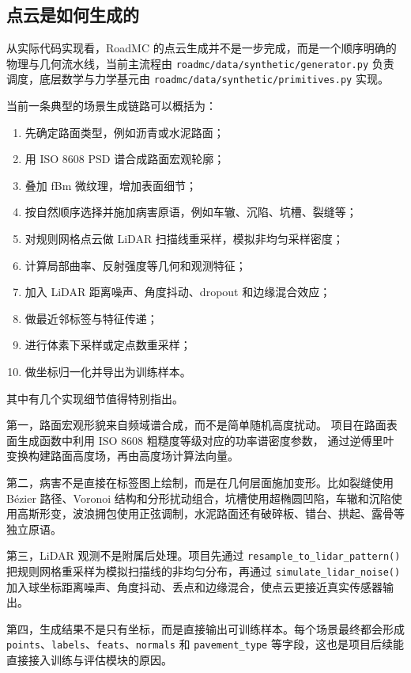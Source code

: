 \documentclass[12pt]{ctexart}
\begin{document}
\subsection{点云是如何生成的}

从实际代码实现看，RoadMC 的点云生成并不是一步完成，而是一个顺序明确的物理与几何流水线，当前主流程由 \texttt{roadmc/data/synthetic/generator.py} 负责调度，底层数学与力学基元由 \texttt{roadmc/data/synthetic/primitives.py} 实现。

当前一条典型的场景生成链路可以概括为：

\begin{enumerate}
  \item 先确定路面类型，例如沥青或水泥路面；
  \item 用 ISO 8608 PSD 谱合成路面宏观轮廓；
  \item 叠加 fBm 微纹理，增加表面细节；
  \item 按自然顺序选择并施加病害原语，例如车辙、沉陷、坑槽、裂缝等；
  \item 对规则网格点云做 LiDAR 扫描线重采样，模拟非均匀采样密度；
  \item 计算局部曲率、反射强度等几何和观测特征；
  \item 加入 LiDAR 距离噪声、角度抖动、dropout 和边缘混合效应；
  \item 做最近邻标签与特征传递；
  \item 进行体素下采样或定点数重采样；
  \item 做坐标归一化并导出为训练样本。
\end{enumerate}

其中有几个实现细节值得特别指出。

第一，路面宏观形貌来自频域谱合成，而不是简单随机高度扰动。
项目在路面表面生成函数中利用 ISO 8608 粗糙度等级对应的功率谱密度参数，
通过逆傅里叶变换构建路面高度场，再由高度场计算法向量。

第二，病害不是直接在标签图上绘制，而是在几何层面施加变形。比如裂缝使用 Bézier 路径、Voronoi 结构和分形扰动组合，坑槽使用超椭圆凹陷，车辙和沉陷使用高斯形变，波浪拥包使用正弦调制，水泥路面还有破碎板、错台、拱起、露骨等独立原语。

第三，LiDAR 观测不是附属后处理。项目先通过 \texttt{resample\_to\_lidar\_pattern()} 把规则网格重采样为模拟扫描线的非均匀分布，再通过 \texttt{simulate\_lidar\_noise()} 加入球坐标距离噪声、角度抖动、丢点和边缘混合，使点云更接近真实传感器输出。

第四，生成结果不是只有坐标，而是直接输出可训练样本。每个场景最终都会形成 \texttt{points}、\texttt{labels}、\texttt{feats}、\texttt{normals} 和 \texttt{pavement\_type} 等字段，这也是项目后续能直接接入训练与评估模块的原因。
\end{document}
